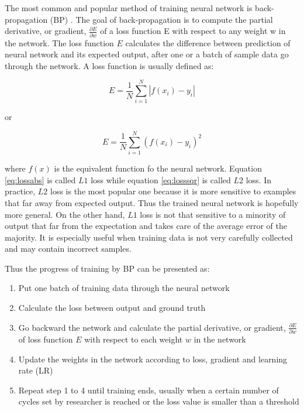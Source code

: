 The most common and popular method of training neural network is back-propagation (BP) \cite{Rumelhart1986}. The goal of back-propagation is to compute the partial derivative, or gradient, $\frac{\partial E}{\partial w}$ of a loss function E with respect to any weight w in the network. The loss function
$E$ calculates the difference between prediction of neural network and its expected output, after one or a batch of sample data go through the network. A loss function is usually defined as:

\begin{equation} \label{eq:lossabs}
E=\frac{1}{N}\sum_{i=1}^{N}|f(x_i)-y_i| 
\end{equation}

or

\begin{equation} \label{eq:losssqr}
E=\frac{1}{N}\sum_{i=1}^{N}(f(x_i)-y_i)^{2} 
\end{equation}

where $f(x)$ is the equivalent function fo the neural network. Equation \ref{eq:lossabs} is called $L1$ loss while equation \ref{eq:losssqr} is called $L2$ loss. In practice, $L2$ loss is the most popular one because it is more sensitive to examples that far away from expected output. Thus
the trained neural network is hopefully more general. On the other hand, $L1$ loss is not
that sensitive to a minority of output that far from the expectation and takes care of the
average error of the majority. It is especially useful when training data is not very carefully
collected and may contain incorrect samples.

Thus the progress of training by BP can be presented as:

\begin{enumerate}
  \item Put one batch of training data through the neural network
  \item Calculate the loss between output and ground truth
  \item Go backward the network and calculate the partial derivative, or gradient, $\frac{\partial E}{\partial w}$
of loss function $E$ with respect to each weight $w$ in the network
  \item Update the weights in the network according to loss, gradient and learning rate (LR)
  \item Repeat step 1 to 4 until training ends, usually when a certain number of cycles set
by researcher is reached or the loss value is smaller than a threshold
\end{enumerate}

